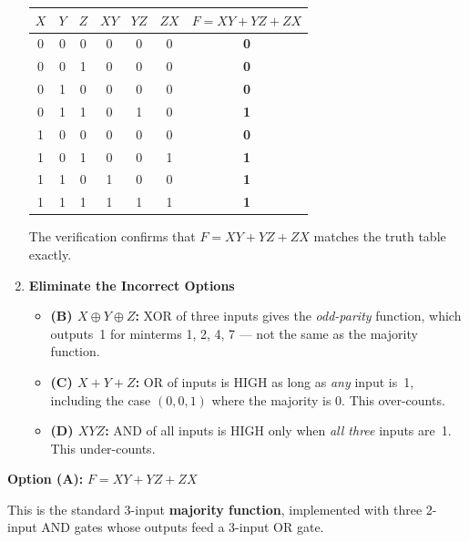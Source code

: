 \documentclass[12pt, a4paper]{article}
\begin{document}
\begin{enumerate}[label=\textbf{Step \arabic*.}, leftmargin=*, itemsep=8pt]
  \begin{center}
    \renewcommand{\arraystretch}{1.3}
    \begin{tabular}{|c|c|c||c|c|c||c|}
      \hline
      $X$ & $Y$ & $Z$ & $XY$ & $YZ$ & $ZX$ & $F = XY+YZ+ZX$ \\
      \hline
      0 & 0 & 0 & 0 & 0 & 0 & \textbf{0} \\
      0 & 0 & 1 & 0 & 0 & 0 & \textbf{0} \\
      0 & 1 & 0 & 0 & 0 & 0 & \textbf{0} \\
      0 & 1 & 1 & 0 & 1 & 0 & \textbf{1} \\
      1 & 0 & 0 & 0 & 0 & 0 & \textbf{0} \\
      1 & 0 & 1 & 0 & 0 & 1 & \textbf{1} \\
      1 & 1 & 0 & 1 & 0 & 0 & \textbf{1} \\
      1 & 1 & 1 & 1 & 1 & 1 & \textbf{1} \\
      \hline
    \end{tabular}
  \end{center}
  The verification confirms that $F = XY + YZ + ZX$ matches the truth
  table exactly.

  \item \textbf{Eliminate the Incorrect Options}

  \begin{itemize}
    \item \textbf{(B) $X \oplus Y \oplus Z$:} XOR of three inputs gives
          the \emph{odd-parity} function, which outputs~1 for minterms 1, 2, 4, 7
          — not the same as the majority function.
    \item \textbf{(C) $X + Y + Z$:} OR of inputs is HIGH as long as
          \emph{any} input is~1, including the case $(0,0,1)$ where the
          majority is 0. This over-counts.
    \item \textbf{(D) $XYZ$:} AND of all inputs is HIGH only when
          \emph{all three} inputs are~1. This under-counts.
  \end{itemize}
\end{enumerate}

\begin{tcolorbox}[colback=answergreen!8, colframe=answergreen,
    title={\textbf{Correct Answer}}, fonttitle=\bfseries]
  \textbf{Option (A):} $F = XY + YZ + ZX$

  This is the standard 3-input \textbf{majority function}, implemented with
  three 2-input AND gates whose outputs feed a 3-input OR gate.
\end{tcolorbox}
\end{document}
